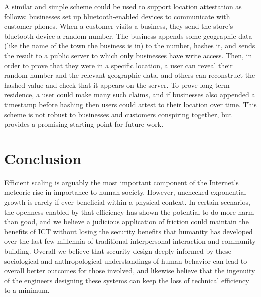 \documentclass[sigconf,authordraft]{acmart}
\begin{document}
A similar and simple scheme could be used to support location attestation as follows: businesses set up bluetooth-enabled devices to communicate with customer phones. When a customer visits a business, they send the store's bluetooth device a random number. The business appends some geographic data (like the name of the town the business is in) to the number, hashes it, and sends the result to a public server to which only businesses have write access. Then, in order to prove that they were in a specific location, a user can reveal their random number and the relevant geographic data, and others can reconstruct the hashed value and check that it appears on the server. To prove long-term residence, a user could make many such claims, and if businesses also appended a timestamp before hashing then users could  attest to their location over time. This scheme is not robust to businesses and customers conspiring together, but provides a promising starting point for future work.  


\section{Conclusion}

Efficient scaling is arguably the most important component of the Internet's meteoric rise in
importance to human society. However, unchecked exponential growth is rarely if ever beneficial
within a physical context. In certain scenarios, the openness enabled by that efficiency has shown
the potential to do more harm than good, and we believe a judicious application of friction could
maintain the benefits of ICT without losing the security benefits that humanity has developed over
the last few millennia of traditional interpersonal interaction and community building. Overall we
believe that security design deeply informed by these sociological and anthropological
understandings of human behavior can lead to overall better outcomes for those involved, and
likewise believe that the ingenuity of the engineers designing these systems can keep the loss of
technical efficiency to a minimum.




\end{document}

